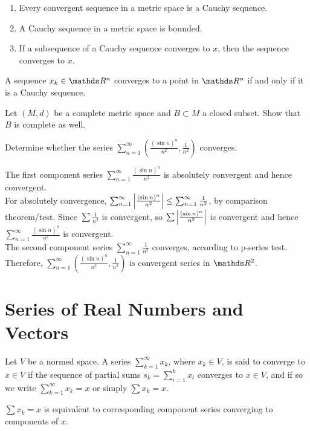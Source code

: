 \documentclass[../main-sheet.tex]{subfiles}
\begin{document}
\begin{thm}
    \hfill
    \begin{enumerate}[label=(\roman*)]
        \item Every convergent sequence in a metric space is a Cauchy sequence.
        \item A Cauchy sequence in a metric space is bounded.
        \item If a subsequence of a Cauchy sequence converges to $ x $, then the sequence converges to $ x $.
    \end{enumerate}
\end{thm}
\begin{thm}
    A sequence $ x_k \in \R^n $ converges to a point in $ \R^n $ if and only if it is a Cauchy sequence.
\end{thm}

\begin{prob}[2.8.8 - P.125, Marsden]
    Let $ (M,d) $ be a complete metric space and $ B\subset M $ a closed subset. Show that $ B $ is complete as well.
\end{prob}
\begin{prob}
    Determine whether the series $ \displaystyle \sum_{n=1}^\infty \left( \frac{(\sin n)^n}{n^2},\frac{1}{n^2} \right) $ converges.
\end{prob}
\begin{soln}
    The first component series $ \sum_{n=1}^\infty \frac{(\sin n)^n}{n^2} $ is absolutely convergent and hence convergent.\\
    For absolutely convergence, $ \sum_{n=1}^\infty\left\vert\frac{(\sin n)^n}{n^2}\right\vert \leq \sum_{n=1}^\infty \frac{1}{n^2} $, by comparison theorem/test. Since $ \sum \frac{1}{n^2} $ is convergent, so $ \sum \left\vert\frac{(\sin n)^n}{n^2}\right\vert $ is convergent and hence $ \sum_{n=1}^\infty\frac{(\sin n)^n}{n^2} $ is convergent.\\
    The second component series $ \sum_{n=1}^\infty\frac{1}{n^2} $ converges, according to p-series test.\\
    Therefore, $ \displaystyle \sum_{n=1}^\infty \left( \frac{(\sin n)^n}{n^2},\frac{1}{n^2} \right) $ is convergent series in $ \R^2 $.
\end{soln}
\section{Series of Real Numbers and Vectors}
\begin{defn}
    Let $ V $ be a normed space. A series $ \sum_{k=1}^\infty x_k$, where $ x_k \in V$, is said to converge to $ x\in V $ if the sequence of partial sums $ s_k =\sum_{i=1}^k x_i $ converges to $ x\in V $, and if so we write $ \sum_{k=1}^\infty x_k=x $ or simply $ \sum x_k=x $.
\end{defn}
\begin{thm}
    $ \sum x_k=x $ is equivalent to corresponding component series converging to components of $ x $.
\end{thm}
\end{document}
